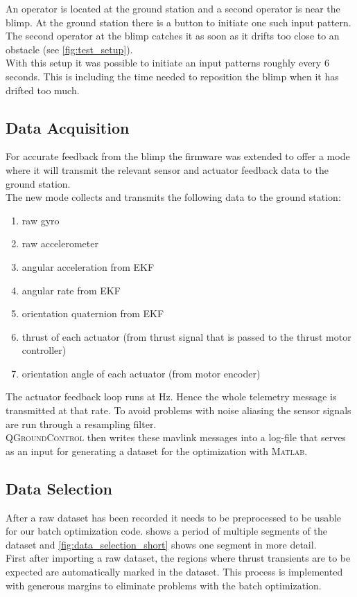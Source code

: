 An operator is located at the ground station and a second operator is near the blimp.
At the ground station there is a button to initiate one such input pattern.
The second operator at the blimp catches it as soon as it drifts too close to an obstacle (see \cref{fig:test_setup}). \\
With this setup it was possible to initiate an input patterns roughly every 6 seconds. 
This is including the time needed to reposition the blimp when it has drifted too much.



\subsection{Data Acquisition}
\label{sub:data_acquisition}
For accurate feedback from the blimp the firmware was extended to offer a mode where it will transmit the relevant sensor and actuator feedback data to the ground station. \\
The new mode collects and transmits the following data to the ground station:
\begin{enumerate}
\item raw gyro
\item raw accelerometer
\item angular acceleration from EKF
\item angular rate from EKF
\item orientation quaternion from EKF
\item thrust of each actuator (from thrust signal that is passed to the thrust motor controller)
\item orientation angle of each actuator (from motor encoder)
\end{enumerate}
The actuator feedback loop runs at \unit[25]{Hz}.
Hence the whole telemetry message is transmitted at that rate.
To avoid problems with noise aliasing the sensor signals are run through a resampling filter.\\
\textsc{QGroundControl} then writes these mavlink messages into a log-file that serves as an input for generating a dataset for the optimization with \textsc{Matlab}.

\subsection{Data Selection}
\label{sub:data_selection}
After a raw dataset has been recorded it needs to be preprocessed to be usable for our batch optimization code.
 shows a period of multiple segments of the dataset and \cref{fig:data_selection_short} shows one segment in more detail.\\
First after importing a raw dataset, the regions where thrust transients are to be expected are automatically marked in the dataset.
This process is implemented with generous margins to eliminate problems with the batch optimization.

